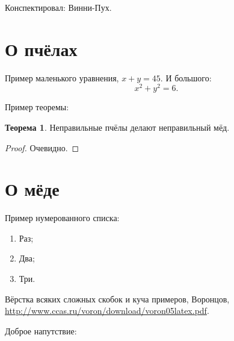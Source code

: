 \documentclass[12pt]{article} %
\theoremstyle{definition} %
\newtheorem{theorem}{Теорема}[section]
\begin{document}
Конспектировал: Винни-Пух.

\section{О пчёлах}

Пример маленького уравнения, $x + y = 45$. И большого:
\[
x^2 + y^2 = 6.
\]

Пример теоремы:
\begin{theorem}
Неправильные пчёлы делают неправильный мёд.
\end{theorem}

\begin{proof}
Очевидно.
\end{proof}

\section{О мёде}

Пример нумерованного списка:
\begin{enumerate}
\item Раз;
\item Два;
\item Три.
\end{enumerate}


Вёрстка всяких сложных скобок и куча примеров, Воронцов, \url{http://www.ccas.ru/voron/download/voron05latex.pdf}.

Доброе напутствие:
\end{document}
